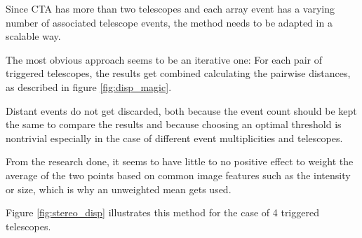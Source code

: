 Since CTA has more than two telescopes and each array event has a varying number
of associated telescope events, the method needs to be adapted in a scalable way.

The most obvious approach seems to be an iterative one:
For each pair of triggered telescopes, the results get combined
calculating the pairwise distances, as described in figure \ref{fig:disp_magic}. 

Distant events do not get discarded, both because the event count should be kept the same
to compare the results and because choosing an optimal threshold 
is nontrivial especially in the case of different event multiplicities and
telescopes.

From the research done, it seems to have little to no positive effect to weight
the average of the two points based on common image features such as 
the intensity or size, which is why an unweighted mean gets used.

Figure \ref{fig:stereo_disp} illustrates this method for the case of 4 triggered telescopes.

